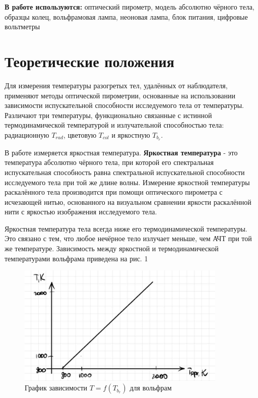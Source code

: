\documentclass[a4paper, 12pt]{article}%
\begin{document}
\textbf{В работе используются:} оптический пирометр, модель абсолютно чёрного тела, образцы колец, вольфрамовая лампа, неоновая лампа, блок питания, цифровые вольтметры

\section{Теоретические положения}
Для измерения температуры разогретых тел, удалённых от наблюдателя, применяют методы оптической пирометрии, основанные на использовании зависимости испускательной способности исследуемого тела от температуры. Различают три температуры, функционально связанные с истинной термодинамической температурой и излучательной способностью тела: радиационную $T_{rad}$, цветовую $T_{col}$ и яркостную $T_{b_r}$. \par
В работе измеряется яркостная температура. \textbf{Яркостная температура} - это температура абсолютно чёрного тела, при которой его спектральная испускательная способность равна спектральной испускательной способности исследуемого тела при той же длине волны.
 Измерение яркостной температуры раскалённого тела производится при помощи оптического пирометра с исчезающей нитью, основанного на визуальном сравнении яркости раскалённой нити с яркостью изображения исследуемого тела. \par
Яркостная температура тела всегда ниже его термодинамической температуры. Это связано с тем, что любое нечёрное тело излучает меньше, чем АЧТ при той же температуре. Зависимость между яркостной и термодинамической температурами вольфрама приведена на рис. 1

\begin{figure}[!h]
    \centering
    \includegraphics[width=10cm]{fig1.png}
    \caption{График зависимости $T = f(T_{b_r})$ для вольфрам}
    \label{fig:vac}
\end{figure}
\end{document}
